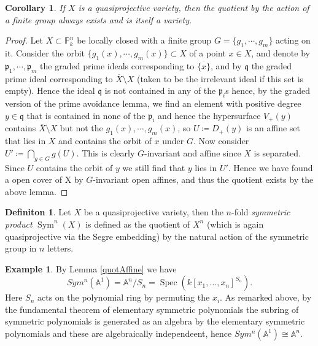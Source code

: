 \documentclass[11pt, a4paper, german]{article}
\theoremstyle{plain}
\newtheorem{corollary}[theorem]{Corollary}
\theoremstyle{definition}
\newtheorem{definition}[theorem]{Definiton}
\newtheorem{example}[theorem]{Example}
\DeclareMathOperator{\Spec}{Spec}
\DeclareMathOperator{\Sym}{Sym}
\begin{document}
\begin{corollary}
    If $X$ is a quasiprojective variety, then the quotient by the action of a finite group always exists and is itself a variety.
\end{corollary}
\begin{proof}
    Let $X \subset \mathbb{P}_k^n$ be locally closed with a finite group $G = \{g_1,\cdots,g_m\}$ acting on it. 
    Consider the orbit $\{g_1(x),\cdots,g_m(x)\} \subset X$ of a point $x \in X$, and denote by $\mathfrak{p}_1,\cdots,\mathfrak{p}_m$ the 
    graded prime ideals corresponding to $\overline{\{x\}}$, and by $\mathfrak{q}$ the graded prime ideal corresponding to
    $\overline{X} \setminus X$ (taken to be the irrelevant ideal if this set is empty). 
    Hence the ideal $\mathfrak{q}$ is not contained in any of the $\mathfrak{p}_i$s hence, by the graded version of the prime
    avoidance lemma, we find an element with positive degree $y \in \mathfrak{q}$ that is contained in none of the $\mathfrak{p}_i$ and hence
    the hypersurface $V_+(y)$ contains $\bar{X} \setminus X$ but not the $g_1(x),\cdots,g_m(x)$, so $U \coloneqq D_+(y)$ 
    is an affine set that lies in $X$ and contains the orbit of $x$ under $G$. Now consider $U' \coloneqq \bigcap_{g \in G} g(U)$. This is clearly
    $G$-invariant and affine since $X$ is separated. 
    Since $U$ contains the orbit of $y$ we still find that $y$ lies in $U'$. Hence we have found a open cover of X by
    $G$-invariant open affines, and thus the quotient exists by the above lemma.
\end{proof}

\begin{definition}
    \label{symdef}
    Let $X$ be a quasiprojective variety, then the $n$-fold \emph{symmetric product} $\Sym^n(X)$ is defined as the quotient of $X^n$
    (which is again quasiprojective via the Segre embedding) by the natural action of the symmetric group in $n$ letters.
\end{definition}

\begin{example}
    By Lemma \ref{quotAffine} we have 
    \[
        Sym^n(\mathbb{A}^1) = \mathbb{A}^n/S_n = \Spec(k[x_1,\dots,x_n]^{S_n}).
    \]
    Here $S_n$ acts on the
    polynomial ring by permuting the $x_i$. As remarked above, by the fundamental theorem of elementary symmetric polynomials the subring
    of symmetric polynomials is generated as an algebra by the elementary symmetric polynomials and these are algebraically independeent, hence
    $Sym^n(\mathbb{A}^1) \cong \mathbb{A}^n$.
\end{example}
\end{document}
